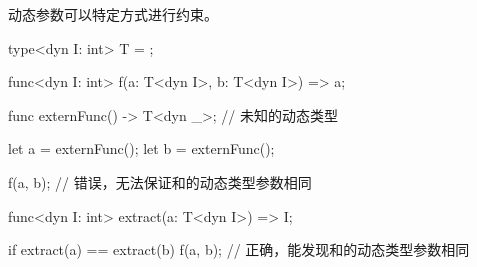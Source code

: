 \pnum
动态参数可以特定方式进行约束。

\enterexample
\begin{codeblock}

type<dyn I: int> T = { };

func<dyn I: int> f(a: T<dyn I>, b: T<dyn I>) => a;

func externFunc() -> T<dyn _>; // 未知的动态类型

let a = externFunc();
let b = externFunc();

f(a, b); // 错误，无法保证和的动态类型参数相同

func<dyn I: int> extract(a: T<dyn I>) => I;

if extract(a) == extract(b) {
    f(a, b); // 正确，能发现和的动态类型参数相同
}

\end{codeblock}
\exitexample